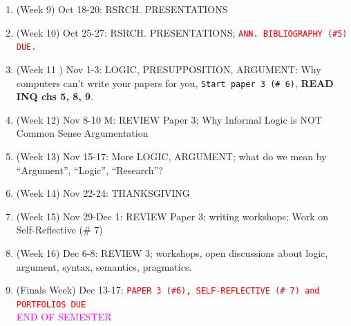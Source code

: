 \documentclass[11pt]{article}
\begin{document}
\begin{enumerate}
\item (Week 9) Oct 18-20: RSRCH. PRESENTATIONS

\item (Week 10) Oct 25-27: RSRCH. PRESENTATIONS; \textcolor{red}{\texttt{ANN. BIBLIOGRAPHY (\#5) DUE.}}

\item (Week 11  ) Nov 1-3: LOGIC, PRESUPPOSITION, ARGUMENT: Why computers can't write your papers for you, \texttt{Start paper 3 (\# 6)}, \textbf{READ INQ chs 5, 8, 9}. 

\item (Week 12) Nov 8-10 M: REVIEW Paper 3; Why Informal Logic is NOT Common Sense Argumentation

\item (Week 13) Nov 15-17: More LOGIC, ARGUMENT; what do we mean by ``Argument'', ``Logic'', ``Research''?
 
\item (Week 14) Nov 22-24: THANKSGIVING 

\item (Week 15) Nov 29-Dec 1: REVIEW Paper 3; writing workshops; Work on Self-Reflective (\# 7) 

\item (Week 16) Dec 6-8: REVIEW 3; workshops, open discussions about logic, argument, syntax, semantics, pragmatics.

\item (Finals Week) Dec 13-17: \textcolor{red}{\texttt{PAPER 3 (\#6), SELF-REFLECTIVE (\# 7)  and PORTFOLIOS DUE}} \\ 
\textcolor{magenta}{END OF SEMESTER}
\end{enumerate}
% 
% 
\end{document}
